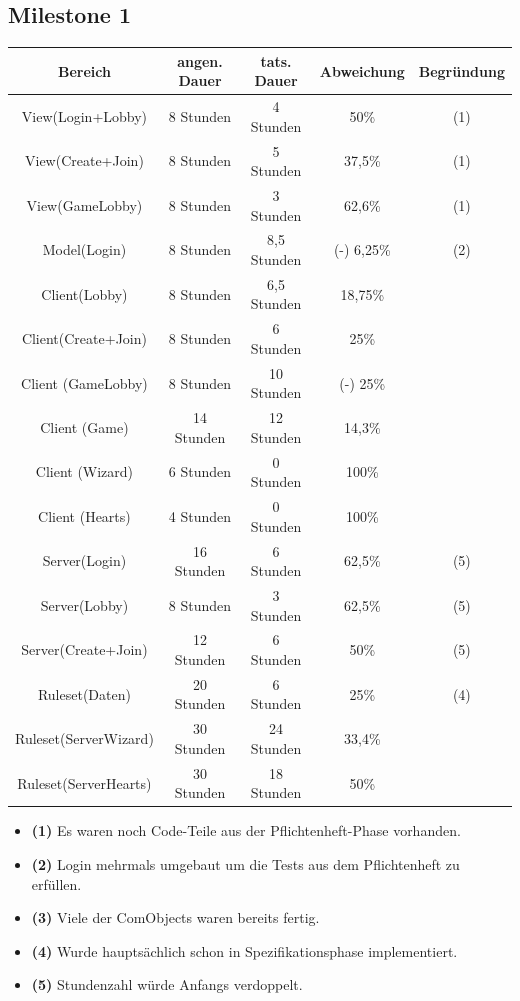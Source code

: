 \documentclass{article}
\begin{document}
\subsection{Milestone 1}

\begin{tabular}{|c|c|c|c|c|}\hline
   Bereich & angen. Dauer & tats. Dauer & Abweichung & Begründung \\ \hline\hline
   View(Login+Lobby) & 8 Stunden & 4 Stunden & 50\% & (1) \\ \hline
   View(Create+Join) & 8 Stunden & 5 Stunden & 37,5\% & (1)\\ \hline
   View(GameLobby) & 8 Stunden & 3 Stunden & 62,6\% & (1)\\ \hline
   Model(Login) & 8 Stunden & 8,5 Stunden & (-) 6,25\% & (2) \\ \hline
   Client(Lobby) & 8 Stunden &  6,5 Stunden & 18,75\% &\\ \hline
   Client(Create+Join) &  8 Stunden & 6 Stunden & 25\% &\\ \hline
   Client (GameLobby) &  8 Stunden & 10 Stunden & (-) 25\% &\\ \hline
   Client (Game) & 14  Stunden &  12 Stunden & 14,3\% &\\ \hline
   Client (Wizard) & 6 Stunden & 0 Stunden & 100\% &\\ \hline
   Client (Hearts) & 4 Stunden & 0 Stunden & 100\% &\\ \hline
   Server(Login) & 16 Stunden & 6 Stunden & 62,5\% & (5) \\ \hline
   Server(Lobby) & 8 Stunden & 3 Stunden & 62,5\% & (5)\\ \hline 
   Server(Create+Join) & 12 Stunden & 6 Stunden & 50\% & (5)\\ \hline 
   Ruleset(Daten) & 20 Stunden & 6 Stunden & 25\% & (4) \\ \hline 
   Ruleset(ServerWizard) & 30 Stunden & 24 Stunden & 33,4\% &\\ \hline 
   Ruleset(ServerHearts) & 30 Stunden & 18 Stunden & 50\% &\\ \hline 
 \end{tabular}

\begin{itemize}
\item \textbf{(1)} Es waren noch Code-Teile aus der Pflichtenheft-Phase vorhanden. \\
\item \textbf{(2)} Login mehrmals umgebaut um die Tests aus dem Pflichtenheft zu erfüllen. \\
\item \textbf{(3)} Viele der ComObjects waren bereits fertig. \\
\item \textbf{(4)} Wurde hauptsächlich schon in Spezifikationsphase implementiert. \\
\item \textbf{(5)} Stundenzahl würde Anfangs verdoppelt. \\
\end{itemize}
\end{document}

